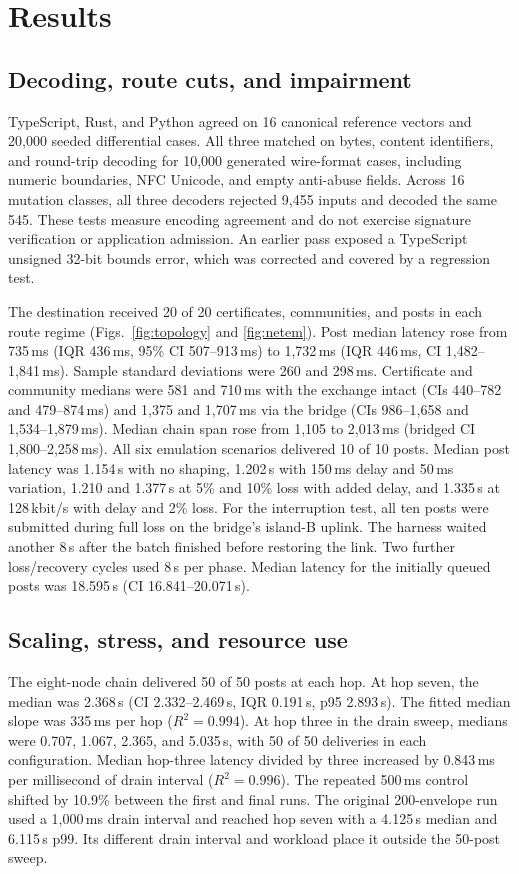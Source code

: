 \documentclass[conference,a4paper,10pt]{IEEEtran}
\begin{document}
\section{Results}

\subsection{Decoding, route cuts, and impairment}

TypeScript, Rust, and Python agreed on 16 canonical reference vectors and 20,000 seeded differential cases. All three matched on bytes, content identifiers, and round-trip decoding for 10,000 generated wire-format cases, including numeric boundaries, NFC Unicode, and empty anti-abuse fields. Across 16 mutation classes, all three decoders rejected 9,455 inputs and decoded the same 545. These tests measure encoding agreement and do not exercise signature verification or application admission. An earlier pass exposed a TypeScript unsigned 32-bit bounds error, which was corrected and covered by a regression test.

The destination received 20 of 20 certificates, communities, and posts in each route regime (Figs.~\ref{fig:topology} and \ref{fig:netem}). Post median latency rose from 735\,ms (IQR 436\,ms, 95\% CI 507--913\,ms) to 1,732\,ms (IQR 446\,ms, CI 1,482--1,841\,ms). Sample standard deviations were 260 and 298\,ms. Certificate and community medians were 581 and 710\,ms with the exchange intact (CIs 440--782 and 479--874\,ms) and 1,375 and 1,707\,ms via the bridge (CIs 986--1,658 and 1,534--1,879\,ms). Median chain span rose from 1,105 to 2,013\,ms (bridged CI 1,800--2,258\,ms). All six emulation scenarios delivered 10 of 10 posts. Median post latency was 1.154\,s with no shaping, 1.202\,s with 150\,ms delay and 50\,ms variation, 1.210 and 1.377\,s at 5\% and 10\% loss with added delay, and 1.335\,s at 128\,kbit/s with delay and 2\% loss. For the interruption test, all ten posts were submitted during full loss on the bridge's island-B uplink. The harness waited another 8\,s after the batch finished before restoring the link. Two further loss/recovery cycles used 8\,s per phase. Median latency for the initially queued posts was 18.595\,s (CI 16.841--20.071\,s).

\subsection{Scaling, stress, and resource use}

The eight-node chain delivered 50 of 50 posts at each hop. At hop seven, the median was 2.368\,s (CI 2.332--2.469\,s, IQR 0.191\,s, p95 2.893\,s). The fitted median slope was 335\,ms per hop ($R^2=0.994$). At hop three in the drain sweep, medians were 0.707, 1.067, 2.365, and 5.035\,s, with 50 of 50 deliveries in each configuration. Median hop-three latency divided by three increased by 0.843\,ms per millisecond of drain interval ($R^2=0.996$). The repeated 500\,ms control shifted by 10.9\% between the first and final runs. The original 200-envelope run used a 1,000\,ms drain interval and reached hop seven with a 4.125\,s median and 6.115\,s p99. Its different drain interval and workload place it outside the 50-post sweep.
\end{document}
